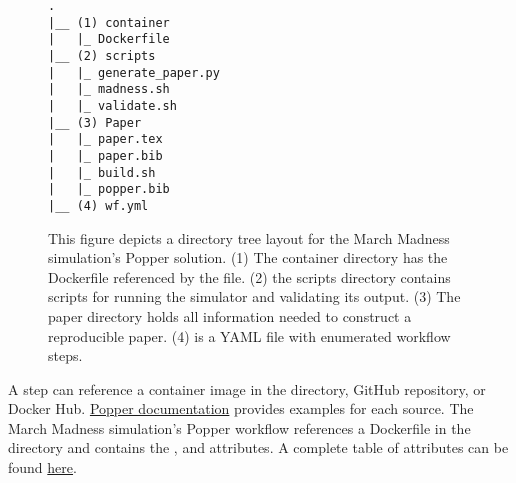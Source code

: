 \documentclass{IEEEtran}
\begin{document}
\begin{figure}[h]
\centering
\begin{mdframed}
\small
\begin{verbatim}
.
|__ (1) container
|   |_ Dockerfile
|__ (2) scripts
|   |_ generate_paper.py
|   |_ madness.sh
|   |_ validate.sh
|__ (3) Paper
|   |_ paper.tex
|   |_ paper.bib
|   |_ build.sh
|   |_ popper.bib
|__ (4) wf.yml
\end{verbatim}
\end{mdframed}
\caption{\footnotesize This figure depicts a directory tree layout for the March Madness simulation's Popper solution. (1) The container directory has the Dockerfile referenced by the  file. (2) the scripts directory contains scripts for running the simulator and validating its output. (3) The paper directory holds all information needed to construct a reproducible paper. (4)  is a YAML file with enumerated workflow steps.}
\label{tree}
\end{figure}

 A step can reference a container image in the directory, GitHub repository, or Docker Hub. \href{https://popper.readthedocs.io/en/latest/sections/cn_workflows.html#referencing-images-in-a-step}{Popper documentation} provides examples for each source. The March Madness simulation's Popper workflow references a Dockerfile in the directory and contains the ,  and  attributes. A complete table of attributes can be found \href{https://popper.readthedocs.io/en/latest/sections/cn_workflows.html#workflow-steps}{here}.
\end{document}
